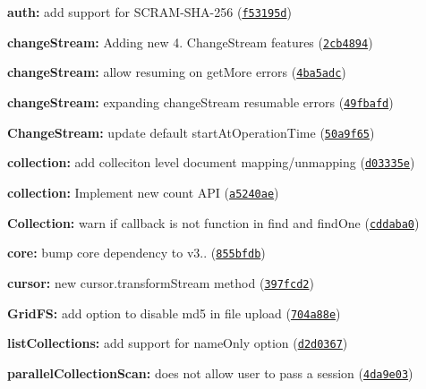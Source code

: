\begin{DoxyItemize}
\item {\bfseries auth\+:} add support for S\+C\+R\+A\+M-\/\+S\+H\+A-\/256 (\href{https://github.com/mongodb/node-mongodb-native/commit/f53195d}{\tt f53195d})
\item {\bfseries change\+Stream\+:} Adding new 4. Change\+Stream features (\href{https://github.com/mongodb/node-mongodb-native/commit/2cb4894}{\tt 2cb4894})
\item {\bfseries change\+Stream\+:} allow resuming on get\+More errors (\href{https://github.com/mongodb/node-mongodb-native/commit/4ba5adc}{\tt 4ba5adc})
\item {\bfseries change\+Stream\+:} expanding change\+Stream resumable errors (\href{https://github.com/mongodb/node-mongodb-native/commit/49fbafd}{\tt 49fbafd})
\item {\bfseries Change\+Stream\+:} update default start\+At\+Operation\+Time (\href{https://github.com/mongodb/node-mongodb-native/commit/50a9f65}{\tt 50a9f65})
\item {\bfseries collection\+:} add colleciton level document mapping/unmapping (\href{https://github.com/mongodb/node-mongodb-native/commit/d03335e}{\tt d03335e})
\item {\bfseries collection\+:} Implement new count A\+PI (\href{https://github.com/mongodb/node-mongodb-native/commit/a5240ae}{\tt a5240ae})
\item {\bfseries Collection\+:} warn if callback is not function in find and find\+One (\href{https://github.com/mongodb/node-mongodb-native/commit/cddaba0}{\tt cddaba0})
\item {\bfseries core\+:} bump core dependency to v3.. (\href{https://github.com/mongodb/node-mongodb-native/commit/855bfdb}{\tt 855bfdb})
\item {\bfseries cursor\+:} new cursor.\+transform\+Stream method (\href{https://github.com/mongodb/node-mongodb-native/commit/397fcd2}{\tt 397fcd2})
\item {\bfseries Grid\+FS\+:} add option to disable md5 in file upload (\href{https://github.com/mongodb/node-mongodb-native/commit/704a88e}{\tt 704a88e})
\item {\bfseries list\+Collections\+:} add support for name\+Only option (\href{https://github.com/mongodb/node-mongodb-native/commit/d2d0367}{\tt d2d0367})
\item {\bfseries parallel\+Collection\+Scan\+:} does not allow user to pass a session (\href{https://github.com/mongodb/node-mongodb-native/commit/4da9e03}{\tt 4da9e03})

\end{DoxyItemize}
